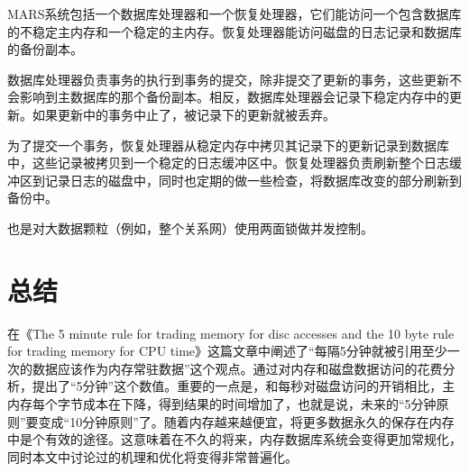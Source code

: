 \documentclass[translation]{zjutreport}
\begin{document}
MARS系统包括一个数据库处理器和一个恢复处理器，它们能访问一个包含数据库的不稳定主内存和一个稳定的主内存。恢复处理器能访问磁盘的日志记录和数据库的备份副本。

数据库处理器负责事务的执行到事务的提交，除非提交了更新的事务，这些更新不会影响到主数据库的那个备份副本。相反，数据库处理器会记录下稳定内存中的更新。如果更新中的事务中止了，被记录下的更新就被丢弃。

为了提交一个事务，恢复处理器从稳定内存中拷贝其记录下的更新记录到数据库中，这些记录被拷贝到一个稳定的日志缓冲区中。恢复处理器负责刷新整个日志缓冲区到记录日志的磁盘中，同时也定期的做一些检查，将数据库改变的部分刷新到备份中。

也是对大数据颗粒（例如，整个关系网）使用两面锁做并发控制。

\chapter{总结}
在《The 5 minute rule for trading memory for disc 
accesses and the 10 byte rule for trading memory for CPU time》这篇文章中阐述了“每隔5分钟就被引用至少一次的数据应该作为内存常驻数据”这个观点。通过对内存和磁盘数据访问的花费分析，提出了“5分钟”这个数值。重要的一点是，和每秒对磁盘访问的开销相比，主内存每个字节成本在下降，得到结果的时间增加了，也就是说，未来的“5分钟原则”要变成“10分钟原则”了。随着内存越来越便宜，将更多数据永久的保存在内存中是个有效的途径。这意味着在不久的将来，内存数据库系统会变得更加常规化，同时本文中讨论过的机理和优化将变得非常普遍化。

\backmatter %
\endgroup %



\clearpage %

\nocite{*}                                   %


\end{document}
